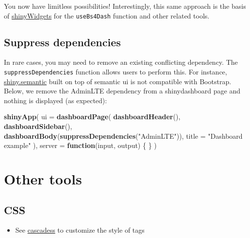 \documentclass[]{book}
\newenvironment{Shaded}{\begin{snugshade}}{\end{snugshade}}
\newcommand{\ControlFlowTok}[1]{\textcolor[rgb]{0.13,0.29,0.53}{\textbf{#1}}}
\newcommand{\DataTypeTok}[1]{\textcolor[rgb]{0.13,0.29,0.53}{#1}}
\newcommand{\KeywordTok}[1]{\textcolor[rgb]{0.13,0.29,0.53}{\textbf{#1}}}
\newcommand{\NormalTok}[1]{#1}
\newcommand{\StringTok}[1]{\textcolor[rgb]{0.31,0.60,0.02}{#1}}
\providecommand{\tightlist}{%
  \setlength{\itemsep}{0pt}\setlength{\parskip}{0pt}}
\begin{document}
You now have limitless possibilities! Interestingly, this same approach is the basis of \href{https://github.com/dreamRs/shinyWidgets/blob/master/R/useBs4Dash.R}{shinyWidgets} for the \texttt{useBs4Dash} function and other related tools.

\hypertarget{suppress-dependencies}{%
\section{Suppress dependencies}\label{suppress-dependencies}}

In rare cases, you may need to remove an existing conflicting dependency. The \texttt{suppressDependencies} function allows users to perform this. For instance, \href{https://github.com/Appsilon/shiny.semantic}{shiny.semantic} built on top of
semantic ui is not compatible with Bootstrap. Below, we remove the AdminLTE dependency
from a shinydashboard page and nothing is displayed (as expected):

\begin{Shaded}
\begin{Highlighting}[]
\KeywordTok{shinyApp}\NormalTok{(}
  \DataTypeTok{ui =} \KeywordTok{dashboardPage}\NormalTok{(}
    \KeywordTok{dashboardHeader}\NormalTok{(),}
    \KeywordTok{dashboardSidebar}\NormalTok{(),}
    \KeywordTok{dashboardBody}\NormalTok{(}\KeywordTok{suppressDependencies}\NormalTok{(}\StringTok{"AdminLTE"}\NormalTok{)),}
    \DataTypeTok{title =} \StringTok{"Dashboard example"}
\NormalTok{  ),}
  \DataTypeTok{server =} \ControlFlowTok{function}\NormalTok{(input, output) \{ \}}
\NormalTok{)}
\end{Highlighting}
\end{Shaded}

\hypertarget{htmltools-other-tools}{%
\chapter{Other tools}\label{htmltools-other-tools}}

\hypertarget{css}{%
\section{CSS}\label{css}}

\begin{itemize}
\tightlist
\item
  See \href{https://github.com/nteetor/cascadess}{cascadess} to customize the style of tags
\end{itemize}
\end{document}
